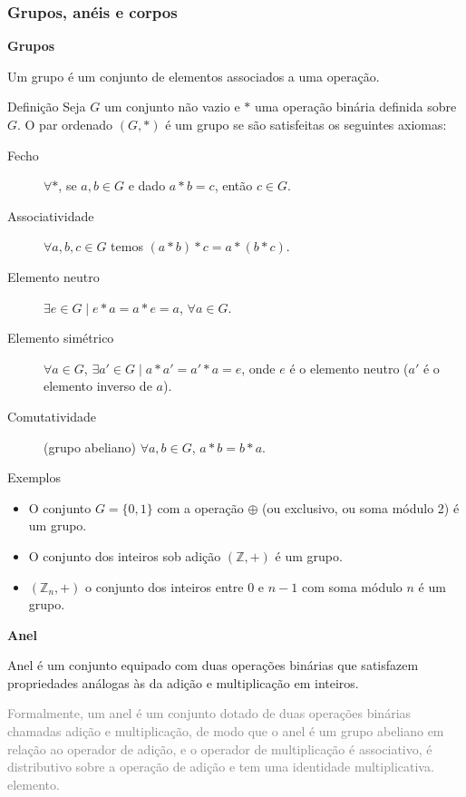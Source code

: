 \documentclass[portuguese,aspectratio=169]{beamer}
\begin{document}
\begin{frame}[allowframebreaks]
\frametitle{Grupos, anéis e corpos}
\textbf{Grupos}

Um grupo é um conjunto de elementos associados a uma operação.

\begin{block}{Definição}
  Seja $G$ um conjunto não vazio e $*$ uma operação binária definida sobre $G$. O par ordenado $(G,*)$ é um grupo se são satisfeitas os seguintes axiomas:
  \begin{description}
    \item[Fecho] $\forall *$, se $a,b \in G$ e dado $a * b = c$, então $c \in G$.
    \item[Associatividade] $\forall a,b,c \in G$ temos $(a * b) * c = a * (b * c)$.
    \item[Elemento neutro] $\exists e \in G \mid e*a=a*e=a$, $\forall a \in G$.
    \item[Elemento simétrico] $\forall a \in G$, $\exists a' \in G \mid a * a' = a' * a = e$, onde $e$ é o elemento neutro ($a'$ é o elemento inverso de $a$).
    \item[Comutatividade] (grupo abeliano) $\forall a, b \in G$, $a * b = b * a$.
  \end{description}
\end{block}

\framebreak
\begin{block}{Exemplos}
  \begin{itemize}
    \item O conjunto $G=\{0,1\}$ com a operação $\oplus$ (ou exclusivo, ou soma módulo 2) é um grupo.
    \item O conjunto dos inteiros sob adição $(\mathbb{Z},+)$ é um grupo.
    \item $(\mathbb{Z}_n,+)$ o conjunto dos inteiros entre $0$ e $n-1$ com soma módulo $n$ é um grupo.
  \end{itemize}
\end{block}

\framebreak
\textbf{Anel}

Anel é um conjunto equipado com duas operações binárias que satisfazem propriedades análogas às da adição e multiplicação em inteiros.

\textcolor{gray}{Formalmente, um anel é um conjunto dotado de duas operações binárias chamadas adição e multiplicação, de modo que o anel é um grupo abeliano em relação ao operador de adição, e o operador de multiplicação é associativo, é distributivo sobre a operação de adição e tem uma identidade multiplicativa. elemento.}


\end{frame}
\end{document}
